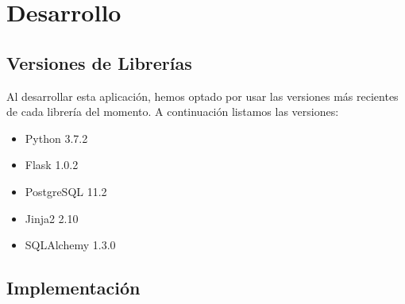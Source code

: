 \chapter{Desarrollo\label{CAP:DESARROLLO}}
  \section{Versiones de Librerías}
    Al desarrollar esta aplicación, hemos optado por usar las versiones más recientes de cada librería del momento. A continuación listamos las versiones:
    \begin{itemize}
      \item Python 3.7.2
      \item Flask 1.0.2
      \item PostgreSQL 11.2
      \item Jinja2 2.10
      \item SQLAlchemy 1.3.0 
    \end{itemize}
  \section{Implementación}

  